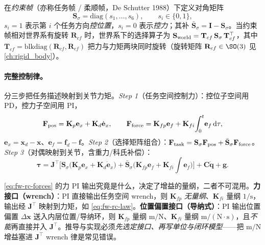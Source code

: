 \begin{definition}[任务选择矩阵与约束帧]
\label{def:fw-selection}
在\emph{约束帧}（亦称任务帧 / 柔顺帧，De Schutter 1988\cite{deschutter1988compliant}）下定义对角矩阵
\begin{equation}
  \mathbf{S}_\sigma=\mathrm{diag}(s_1,\dots,s_6),\qquad s_i\in\{0,1\},
  \label{eq:fw-selection}
\end{equation}
$s_i=1$ 表示第 $i$ 个任务方向\emph{控位置}，$s_i=0$ 表示\emph{控力}；其补 $\bar{\mathbf{S}}_\sigma=\mathbf{I}-\mathbf{S}_\sigma$。当约束帧相对世界系有旋转 $\mathbf{R}_{cf}$ 时，世界系下的选择算子为 $\mathbf{S}_{\rm world}=\mathbf{T}_{cf}\,\mathbf{S}_\sigma\,\mathbf{T}_{cf}^\top$，其中 $\mathbf{T}_{cf}=\mathrm{blkdiag}(\mathbf{R}_{cf},\mathbf{R}_{cf})$ 把力与力矩两块同时旋转（旋转矩阵 $\mathbf{R}_{cf}\in\SO(3)$ 见 \cref{ch:rigid_body}）。
\end{definition}

\paragraph{完整控制律。}
分三步把任务描述映射到关节力矩。\emph{Step 1}（任务空间控制力）：控位子空间用 PD，控力子空间用 PI，
\begin{equation}
  \mathbf{F}_{\rm pos}=\mathbf{K}_p\mathbf{e}_x+\mathbf{K}_d\dot{\mathbf{e}}_x,\qquad
  \mathbf{F}_{\rm force}=\mathbf{K}_{fp}\mathbf{e}_f+\mathbf{K}_{fi}\!\int_0^t\!\mathbf{e}_f\,\mathrm{d}\tau,
  \label{eq:fw-rc-forces}
\end{equation}
$\mathbf{e}_x=\mathbf{x}_d-\mathbf{x}$、$\mathbf{e}_f=\mathbf{f}_d-\mathbf{f}$。\emph{Step 2}（选择矩阵组合）：$\mathbf{F}_{\rm task}=\mathbf{S}_\sigma\mathbf{F}_{\rm pos}+\bar{\mathbf{S}}_\sigma\mathbf{F}_{\rm force}$。\emph{Step 3}（对偶映射到关节，含重力/科氏补偿）：
\begin{equation}
  \boxed{\;\boldsymbol{\tau}=\mathbf{J}^\top\!\Big[\mathbf{S}_\sigma\big(\mathbf{K}_p\mathbf{e}_x+\mathbf{K}_d\dot{\mathbf{e}}_x\big)+\bar{\mathbf{S}}_\sigma\big(\mathbf{K}_{fp}\mathbf{e}_f+\mathbf{K}_{fi}\!\textstyle\int\mathbf{e}_f\big)\Big]+\mathbf{C}\dot{\mathbf{q}}+\mathbf{g}.\;}
  \label{eq:fw-rc-law}
\end{equation}

\begin{remark}
\label{rmk:fw-interface}
\cref{eq:fw-rc-forces} 的力 PI 输出究竟是什么，决定了增益的量纲，二者不可混用。\textbf{力接口（wrench）}：PI 直接输出任务空间 wrench，则 $\mathbf{K}_{fp}$ \emph{无量纲}、$\mathbf{K}_{fi}$ 量纲 $1/\mathrm{s}$，输出经 $\mathbf{J}^\top$ 映射到力矩，如 \cref{eq:fw-rc-law}。\textbf{位置偏置接口（导纳式）}：PI 输出位置偏置 $\Delta\mathbf{x}$ 送入内层位置/导纳环，则 $\mathbf{K}_{fp}$ 量纲 $\mathrm{m/N}$、$\mathbf{K}_{fi}$ 量纲 $\mathrm{m/(N\!\cdot\! s)}$，且\emph{不能}再直接并入 $\mathbf{J}^\top$。推导与实现必须\emph{先选定接口、再写单位与闭环模型}——把 $\mathrm{m/N}$ 增益塞进 $\mathbf{J}^\top$ wrench 律是常见错误。
\end{remark}

